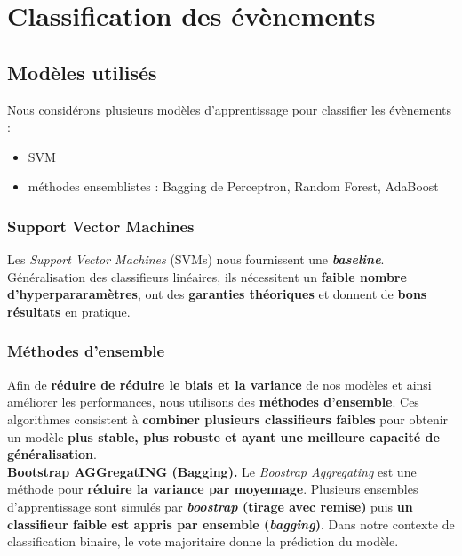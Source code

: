 \documentclass[12pt]{article}
\begin{document}
\section{Classification des évènements}

\subsection{Modèles utilisés}

Nous considérons plusieurs modèles d'apprentissage pour classifier les
évènements :

\begin{itemize}
    \item SVM
    \item méthodes ensemblistes : Bagging de Perceptron, Random Forest, AdaBoost
\end{itemize}

\subsubsection{Support Vector Machines}

Les \emph{Support Vector Machines} (SVMs) nous fournissent une
\textbf{\emph{baseline}}. Généralisation des classifieurs linéaires, ils
nécessitent un \textbf{faible nombre d'hyperpararamètres}, ont des
\textbf{garanties théoriques} et donnent de \textbf{bons résultats} en pratique.

\subsubsection{Méthodes d'ensemble}

Afin de \textbf{réduire de réduire le biais et la variance} de nos modèles et
ainsi améliorer les performances, nous utilisons des \textbf{méthodes
d'ensemble}. Ces algorithmes consistent à \textbf{combiner plusieurs classifieurs
faibles} pour obtenir un modèle \textbf{plus stable, plus robuste et ayant une meilleure
capacité de généralisation}. \\

\textbf{Bootstrap AGGregatING (Bagging). } \quad Le \emph{Boostrap
Aggregating} est une méthode pour \textbf{réduire la variance par moyennage}.
Plusieurs ensembles d'apprentissage sont simulés par \textbf{\emph{boostrap} (tirage
avec remise)} puis \textbf{un classifieur faible est appris par ensemble
(\emph{bagging})}. Dans notre contexte de classification binaire, le vote
majoritaire donne la prédiction du modèle.
\end{document}
